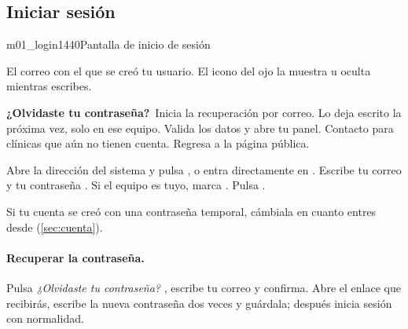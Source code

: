 \documentclass[11pt]{article}
\begin{document}
\subsection{Iniciar sesión}\label{sec:login}


\begin{pantalla}{m01_login}{1440}{Pantalla de inicio de sesión}
\end{pantalla}

\begin{leyenda}
   El correo con el que se creó tu usuario.
   El icono del ojo la muestra u oculta mientras escribes.
  \item[\marca{3}]\textbf{¿Olvidaste tu contraseña?}~Inicia la recuperación por correo.
   Lo deja escrito la próxima vez, solo en ese equipo.
   Valida los datos y abre tu panel.
   Contacto para clínicas que aún no tienen cuenta.
   Regresa a la página pública.
\end{leyenda}

\begin{pasos}
  \paso Abre la dirección del sistema y pulsa , o entra directamente en .
  \paso Escribe tu correo  y tu contraseña .
  \paso Si el equipo es tuyo, marca  .
  \paso Pulsa  .
\end{pasos}

\begin{sdaviso}
Si tu cuenta se creó con una contraseña temporal, cámbiala en cuanto entres desde  (\cref{sec:cuenta}).
\end{sdaviso}

\paragraph{Recuperar la contraseña.} Pulsa \textit{¿Olvidaste tu contraseña?} , escribe tu correo y confirma. Abre el enlace que recibirás, escribe la nueva contraseña dos veces y guárdala; después inicia sesión con normalidad.
\end{document}
